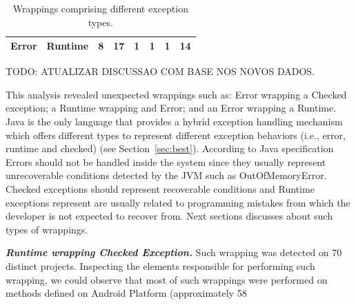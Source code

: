 \documentclass[conference]{IEEEtran}
\begin{document}
\begin{table}
\begin{tabular}{llcccccc}
      Error & Runtime     & 8  &  17   & 1 &  1  & 1 &  14    \\

  \hline
  \end{tabular}
\caption{Wrappings comprising different exception types.}
\label{tab:wrappingandroid}
\end{table}


TODO: ATUALIZAR DISCUSSAO COM BASE NOS NOVOS DADOS.

This analysis revealed unexpected wrappings such as: Error wrapping a Checked 
exception; a Runtime wrapping and Error; and an Error wrapping a Runtime.
Java is the only language that provides a hybrid exception handling mechanism
which offers  different types to represent different exception behaviors (i.e., error, 
runtime and checked) (see Section~\ref{sec:best}). According to Java specification Errors should not be
handled inside the system since they usually represent unrecoverable conditions
detected by the JVM such as OutOfMemoryError. Checked exceptions should
represent recoverable conditions and  Runtime exceptions represent are usually
related to programming mistakes from which the developer is not expected to recover
from. Next sections discusses about such types of wrappings.


\emph{\textbf{Runtime wrapping Checked Exception.}} Such wrapping was 
detected on 70 distinct projects. Inspecting the 
elements responsible for performing such wrapping, we could observe that
most of such wrappings were performed on methods defined on Android
Platform (approximately 58%

\end{document}
